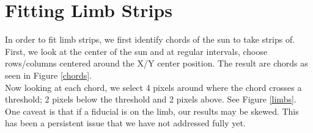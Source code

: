 \documentclass[10pt]{scrartcl}
\begin{document}

\section{Fitting Limb Strips} %
\label{sec:fitting_limb_strips}

In order to fit limb strips, we first identify chords of the sun to take strips of. First, we look at the center of the sun and at regular intervals, choose rows/columns centered around the X/Y center position. The result are chords as seen in Figure \ref{chords}.\\
Now looking at each chord, we select 4 pixels around where the chord crosses a threshold; 2 pixels below the threshold and 2 pixels above. See Figure \ref{limbs}. One caveat is that if a fiducial is on the limb, our results may be skewed. This has been a persistent issue that we have not addressed fully yet.

\begin{figure}[!ht]
\end{figure}
\end{document}
